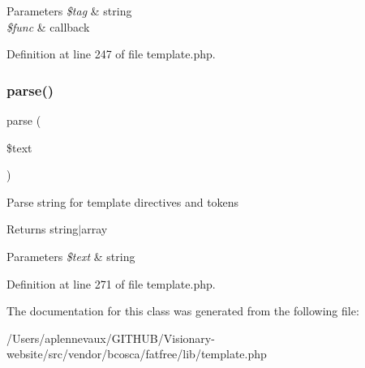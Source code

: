 \begin{DoxyParams}{Parameters}
{\em \$tag} & string \\
\hline
{\em \$func} & callback \\
\hline
\end{DoxyParams}


Definition at line 247 of file template.\+php.

\hypertarget{class_template_aad1c85bef0735e4888d8f8e26652f9f7}{}\label{class_template_aad1c85bef0735e4888d8f8e26652f9f7} 
\subsubsection{\texorpdfstring{parse()}{parse()}}
{\footnotesize\ttfamily parse (\begin{DoxyParamCaption}\item[{}]{\$text }\end{DoxyParamCaption})}

Parse string for template directives and tokens \begin{DoxyReturn}{Returns}
string$\vert$array 
\end{DoxyReturn}

\begin{DoxyParams}{Parameters}
{\em \$text} & string \\
\hline
\end{DoxyParams}


Definition at line 271 of file template.\+php.



The documentation for this class was generated from the following file\+:\begin{DoxyCompactItemize}
\item 
/\+Users/aplennevaux/\+G\+I\+T\+H\+U\+B/\+Visionary-\/website/src/vendor/bcosca/fatfree/lib/template.\+php\end{DoxyCompactItemize}
